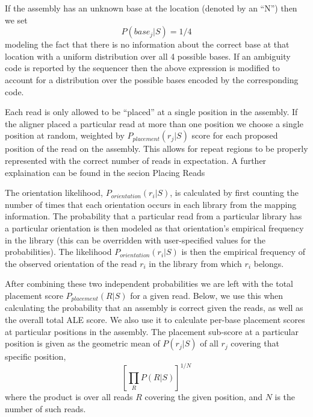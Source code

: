 \documentclass[phd,tocprelim]{cornell}
\begin{document}
If the assembly has an unknown base at the location (denoted by an “N”) then we set
\begin{equation}
    P\left(base_{j}|S\right) = 1/4
\end{equation}
modeling the fact that there is no information about the correct base at that location with a uniform distribution over all 4 possible bases. If an ambiguity code is reported by the sequencer then the above expression is modified to account for a distribution over the possible bases encoded by the corresponding code.

Each read is only allowed to be “placed” at a single position in the assembly. If the aligner placed a particular read at more than one position we choose a single position at random, weighted by $P_{placement}(r_{j}|S)$ score for each proposed position of the read on the assembly. This allows for repeat regions to be properly represented with the correct number of reads in expectation. A further explaination can be found in the secion Placing Reads

The orientation likelihood, $P_{orientation}\left(r_{i}|S\right)$, is calculated by first counting the number of times that each orientation occurs in each library from the mapping information.  The probability that a particular read from a particular library has a particular orientation is then modeled as that orientation’s empirical frequency in the library (this can be overridden with user-specified values for the probabilities).   The likelihood $P_{orientation}\left(r_{i}|S\right)$ is then the empirical frequency of the observed orientation of the read $r_{i}$ in the library from which $r_{i}$ belongs.

After combining these two independent probabilities we are left with the total placement score $P_{placement}(R|S)$ for a given read.  Below, we use this when calculating the probability that an assembly is correct given the reads, as well as the overall total ALE score.  We also use it to calculate per-base placement scores at particular positions in the assembly.  The placement sub-score at a particular position is given as the geometric mean of $P(r_{j}|S)$ of all $r_{j}$ covering that specific position,
\begin{equation}
    \left[\prod_{R}P(R|S)\right]^{1/N}
\end{equation}
where the product is over all reads $R$ covering the given position, and $N$ is the number of such reads.

\end{document}
